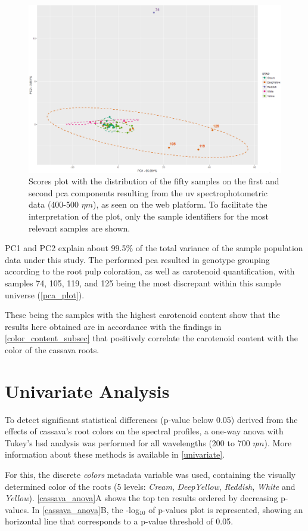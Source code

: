 \begin{figure}[h]
	\centering
	\includegraphics[width=0.7\linewidth]{Imagens/Case_study/pca_plot_3}
	\caption{Scores plot with the distribution of the fifty samples on the first and second \gls{pca} components resulting from the \gls{uv} spectrophotometric data (400-500 $\eta m$), as seen on the web platform. To facilitate the interpretation of the plot, only the sample identifiers for the most relevant samples are shown.}
	\label{pca_plot}
\end{figure}


PC1 and PC2 explain about 99.5\% of the total variance of the sample population data under this study. The performed \gls{pca} resulted in genotype grouping according to the root pulp coloration, as well as carotenoid quantification, with samples 74, 105, 119, and 125 being the most discrepant within this sample universe (\autoref{pca_plot}). 

These being the samples with the highest carotenoid content show that the results here obtained are in accordance with the findings in \autoref{color_content_subsec} that positively correlate the carotenoid content with the color of the cassava roots.


\section{Univariate Analysis} \label{univ_analysis}

To detect significant statistical differences (p-value below 0.05) derived from the effects of cassava's root colors on the spectral profiles, a one-way \gls{anova} with Tukey's \gls{hsd} analysis was performed for all wavelengths (200 to 700 $\eta m$). More information about these methods is available in \autoref{univariate}.

For this, the discrete \textit{colors} metadata variable was used, containing the visually determined color of the roots (5 levels:  \textit{Cream}, \textit{DeepYellow}, \textit{Reddish}, \textit{White} and \textit{Yellow}). \autoref{cassava_anova}A shows the top ten results ordered by decreasing p-values. In \autoref{cassava_anova}B,  the -log$_{10}$ of p-values plot is represented, showing an horizontal line that corresponds to a p-value threshold of 0.05. 

